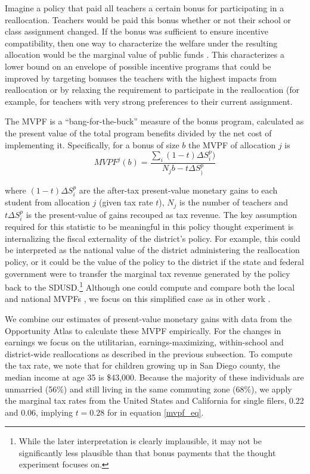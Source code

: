 \documentclass[12pt]{article}
\theoremstyle{definition}
\theoremstyle{definition}
\theoremstyle{definition}
\theoremstyle{definition}
\begin{document}


Imagine a policy that paid all teachers a certain bonus for participating in a reallocation. Teachers would be paid this bonus whether or not their school or class assignment changed. If the bonus was sufficient to ensure incentive compatibility, then one way to characterize the welfare under the resulting allocation would be the marginal value of public funds \citep[MVPF,][]{Keyser_2020}. This characterizes a lower bound on an envelope of possible incentive programs that could be improved by targeting bonuses the teachers with the highest impacts from reallocation or by relaxing the requirement to participate in the reallocation (for example, for teachers with very strong preferences to their current assignment.

The MVPF is a ``bang-for-the-buck'' measure of the bonus program, calculated as the present value of the total program benefits divided by the net cost of implementing it. Specifically, for a bonus of size $b$ the MVPF of allocation $j$ is
\begin{equation}\label{mvpf_eq}
MVPF^j(b) = \frac{\sum_i (1-t)\Delta S^p_i)}{N_j b - t\Delta S^p_)}    
\end{equation}

\noindent where $(1-t)\Delta S^p_i$ are the after-tax present-value monetary gains to each student from allocation $j$ (given  tax rate $t$), $N_j$ is the number of teachers and $t\Delta S^p_i$ is the present-value of gains recouped as tax revenue. The key assumption required for this statistic to be meaningful in this policy thought experiment is internalizing the fiscal externality of the district's policy. For example, this could be interpreted as the national value of the district administering the reallocation policy, or it could be the value of the policy to the district if  the state and federal government were to transfer the marginal tax revenue generated by the policy back to the SDUSD.\footnote{While the later interpretation is clearly implausible, it may not be significantly less plausible than that bonus payments that the thought experiment focuses on.} Although one could compute and compare both the local and national MVPFs \citep[e.g., see][]{agrawal2023new}, we focus on this simplified case as in other work \citep{Keyser_2020}.

We combine our estimates of present-value monetary gains with data from the Opportunity Atlas \citep{?} to calculate these MVPF empirically. For the changes in earnings we focus on the utilitarian, earnings-maximizing, within-school and district-wide reallocations as described in the previous subsection. To compute the tax rate, we note that for children growing up in San Diego county, the median income at age 35 is \$43,000. Because the majority of these individuals are unmarried (56\%) and still living in the same commuting zone (68\%), we apply the marginal tax rates from the United States and California for single filers, 0.22 and 0.06, implying $t=0.28$ for in equation \ref{mvpf_eq}.
\end{document}
